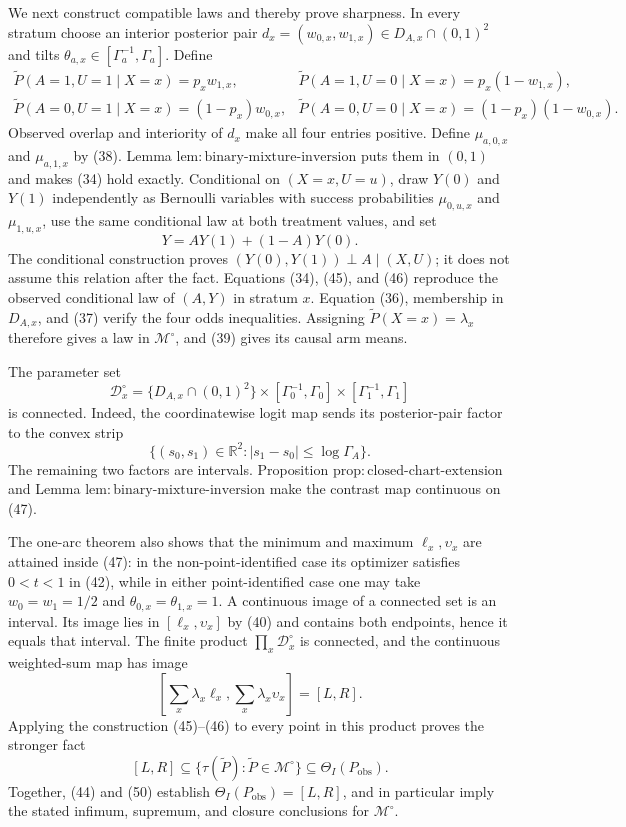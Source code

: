 We next construct compatible laws and thereby prove sharpness.  In every stratum choose an interior posterior pair \(d_x=(w_{0,x},w_{1,x})\in D_{A,x}\cap(0,1)^2\) and tilts \(\theta_{a,x}\in[\Gamma_a^{-1},\Gamma_a]\).  Define
\[
\begin{array}{ll}
 \widetilde P(A=1,U=1\mid X=x)=p_xw_{1,x},
 &\widetilde P(A=1,U=0\mid X=x)=p_x(1-w_{1,x}),\\
 \widetilde P(A=0,U=1\mid X=x)=(1-p_x)w_{0,x},
 &\widetilde P(A=0,U=0\mid X=x)=(1-p_x)(1-w_{0,x}).
\end{array}
\tag{45}
\]
Observed overlap and interiority of \(d_x\) make all four entries positive.  Define \(\mu_{a,0,x}\) and \(\mu_{a,1,x}\) by (38).  Lemma \(\mathrm{lem{:}binary\text{-}mixture\text{-}inversion}\) puts them in \((0,1)\) and makes (34) hold exactly.  Conditional on \((X=x,U=u)\), draw \(Y(0)\) and \(Y(1)\) independently as Bernoulli variables with success probabilities \(\mu_{0,u,x}\) and \(\mu_{1,u,x}\), use the same conditional law at both treatment values, and set
\[
 Y=AY(1)+(1-A)Y(0).
 \tag{46}
\]
The conditional construction proves \((Y(0),Y(1))\perp A\mid(X,U)\); it does not assume this relation after the fact.  Equations (34), (45), and (46) reproduce the observed conditional law of \((A,Y)\) in stratum \(x\).  Equation (36), membership in \(D_{A,x}\), and (37) verify the four odds inequalities.  Assigning \(\widetilde P(X=x)=\lambda_x\) therefore gives a law in \(\mathcal M^{\circ}\), and (39) gives its causal arm means.

The parameter set
\[
 \mathcal D_x^{\circ}
 =\{D_{A,x}\cap(0,1)^2\}
   \times[\Gamma_0^{-1},\Gamma_0]
   \times[\Gamma_1^{-1},\Gamma_1]
 \tag{47}
\]
is connected.  Indeed, the coordinatewise logit map sends its posterior-pair factor to the convex strip
\[
 \{(s_0,s_1)\in\mathbb R^2:
      |s_1-s_0|\leq\log\Gamma_A\}.
 \tag{48}
\]
The remaining two factors are intervals.  Proposition \(\mathrm{prop{:}closed\text{-}chart\text{-}extension}\) and Lemma \(\mathrm{lem{:}binary\text{-}mixture\text{-}inversion}\) make the contrast map continuous on (47).

The one-arc theorem also shows that the minimum and maximum \(\ell_x,\upsilon_x\) are attained inside (47): in the non-point-identified case its optimizer satisfies \(0<t<1\) in (42), while in either point-identified case one may take \(w_0=w_1=1/2\) and \(\theta_{0,x}=\theta_{1,x}=1\).  A continuous image of a connected set is an interval.  Its image lies in \([\ell_x,\upsilon_x]\) by (40) and contains both endpoints, hence it equals that interval.  The finite product \(\prod_x\mathcal D_x^{\circ}\) is connected, and the continuous weighted-sum map has image
\[
 \left[\sum_x\lambda_x\ell_x,
       \sum_x\lambda_x\upsilon_x\right]=[L,R].
 \tag{49}
\]
Applying the construction (45)--(46) to every point in this product proves the stronger fact
\[
 [L,R]\subseteq\{\tau(\widetilde P):\widetilde P\in\mathcal M^{\circ}\}
 \subseteq\Theta_I(P_{\mathrm{obs}}).
 \tag{50}
\]
Together, (44) and (50) establish \(\Theta_I(P_{\mathrm{obs}})=[L,R]\), and in particular imply the stated infimum, supremum, and closure conclusions for \(\mathcal M^{\circ}\).

